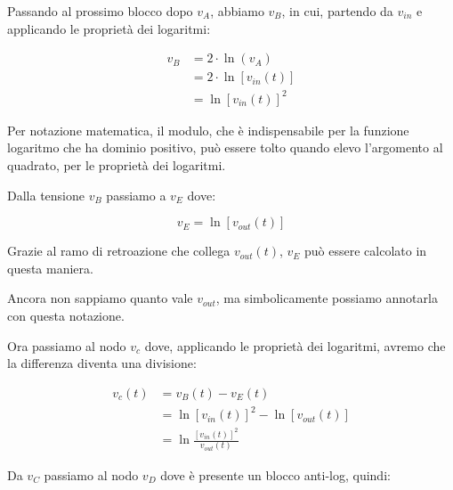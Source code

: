 Passando al prossimo blocco dopo $v_A$, abbiamo $v_B$, in cui, partendo da $v_{in}$ e applicando le proprietà dei logaritmi: 

{
    \Large 
    \begin{equation}
        \begin{split}
            v_B 
            &= 
            2 \cdot \ln(v_A)
            \\ 
            &= 
            2 \cdot \ln [v_{in} (t)]
            \\ 
            &= 
            \ln [v_{in} (t)]^{2}
        \end{split}
    \end{equation}
} 

Per notazione matematica, il modulo, che è indispensabile per la funzione logaritmo che ha dominio positivo, 
può essere tolto quando elevo l'argomento al quadrato, per le proprietà dei logaritmi. \newline 

Dalla tensione $v_B$ passiamo a $v_E$ dove:

{
    \Large 
    \begin{equation}
        v_E = \ln[v_{out}(t)]
    \end{equation}
}

Grazie al ramo di retroazione che collega $v_{out} (t)$, $v_E$ può essere calcolato in questa maniera. \newline 

Ancora non sappiamo quanto vale $v_{out}$, ma simbolicamente possiamo annotarla con questa notazione. \newline 

Ora passiamo al nodo $v_c$ dove, applicando le proprietà dei logaritmi, avremo che la differenza diventa una divisione:

{
    \Large 
    \begin{equation}
        \begin{split}
            v_c (t)
            &= 
            v_B (t) - v_E (t)
            \\
            &=
            \ln[v_{in} (t)]^{2} - \ln[v_{out} (t)]
            \\
            &= 
            \ln
            \frac{[v_{in} (t)]^{2}}{v_{out} (t)}
        \end{split}
    \end{equation}
}

Da $v_C$ passiamo al nodo $v_D$ dove è presente un blocco anti-log, quindi:

